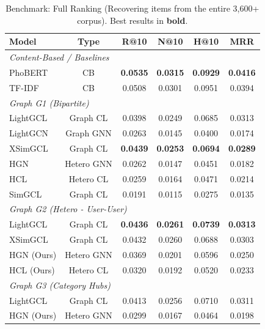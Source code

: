 \documentclass[11pt]{article}
\begin{document}
\begin{table}[t]
  \centering
  \small
  \caption{Benchmark: Full Ranking (Recovering items from the entire 3,600+ corpus). Best results in \textbf{bold}.}
  \label{tab:results_full}
  \begin{tabular}{l|c|cccc}
    \hline
    \textbf{Model} & \textbf{Type} & \textbf{R@10}   & \textbf{N@10}   & \textbf{H@10}   & \textbf{MRR}    \\
    \hline
    \multicolumn{6}{l}{\textit{Content-Based / Baselines}}                                                 \\
    PhoBERT        & CB            & \textbf{0.0535} & \textbf{0.0315} & \textbf{0.0929} & \textbf{0.0416} \\
    TF-IDF         & CB            & 0.0508          & 0.0301          & 0.0951          & 0.0394          \\
    \hline
    \multicolumn{6}{l}{\textit{Graph G1 (Bipartite)}}                                                      \\
    LightGCL       & Graph CL      & 0.0398          & 0.0249          & 0.0685          & 0.0313          \\
    LightGCN       & Graph GNN     & 0.0263          & 0.0145          & 0.0400          & 0.0174          \\
    XSimGCL        & Graph CL      & \textbf{0.0439} & \textbf{0.0253} & \textbf{0.0694} & \textbf{0.0289} \\
    HGN            & Hetero GNN    & 0.0262          & 0.0147          & 0.0451          & 0.0182          \\
    HCL            & Hetero CL     & 0.0259          & 0.0164          & 0.0471          & 0.0214          \\
    SimGCL         & Graph CL      & 0.0191          & 0.0115          & 0.0275          & 0.0135          \\
    \hline
    \multicolumn{6}{l}{\textit{Graph G2 (Hetero - User-User)}}                                             \\
    LightGCL       & Graph CL      & \textbf{0.0436} & \textbf{0.0261} & \textbf{0.0739} & \textbf{0.0313} \\
    XSimGCL        & Graph CL      & 0.0432          & 0.0260          & 0.0688          & 0.0303          \\
    HGN (Ours)     & Hetero GNN    & 0.0369          & 0.0201          & 0.0596          & 0.0250          \\
    HCL (Ours)     & Hetero CL     & 0.0320          & 0.0192          & 0.0520          & 0.0233          \\
    \hline
    \multicolumn{6}{l}{\textit{Graph G3 (Category Hubs)}}                                                  \\
    LightGCL       & Graph CL      & 0.0413          & 0.0256          & 0.0710          & 0.0311          \\
    HGN (Ours)     & Hetero GNN    & 0.0299          & 0.0167          & 0.0464          & 0.0198          \\
    \hline
  \end{tabular}
\end{table}
\end{document}
